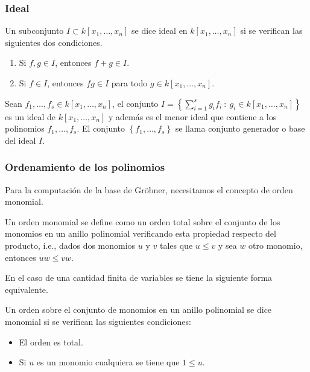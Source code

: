 \subsubsection*{Ideal}

Un subconjunto $I \subset k[x_1, \dotso, x_n]$ se dice ideal en $k[x_1, \dotso, x_n]$ si se verifican las siguientes dos condiciones.
\begin{enumerate}
    \item Si $f, g \in I$, entonces $f + g \in I$.
    \item Si $f \in I$, entonces $fg \in I$ para todo $g \in k[x_1, \dotso, x_n]$.
\end{enumerate}

Sean $f_1, \dotso, f_s \in k[x_1, \dotso, x_n]$, el conjunto $I =  \left\{ \sum_{i=1}^{s} g_i f_i \ : \ g_i \in k[x_1, \dotso, x_n] \right\}$ es un ideal de $k[x_1, \dotso, x_n]$ y además es el menor ideal que contiene a los polinomios $f_1, \dotso, f_s$. El conjunto $\left\{ f_1, \dotso, f_s \right\}$ se llama conjunto generador o base del ideal $I$. 

\subsubsection*{Ordenamiento de los polinomios}

Para la computación de la base de Gröbner, necesitamos el concepto de orden monomial.

\begin{definition}
    Un orden monomial se define como un orden total sobre el conjunto de los monomios en un anillo polinomial verificando esta propiedad respecto del producto, i.e., dados dos monomios $u$ y $v$ tales que $u \leq v$ y sea $w$ otro monomio, entonces $uw \leq vw$.
\end{definition}

En el caso de una cantidad finita de variables se tiene la siguiente forma equivalente.

\begin{definition}
    Un orden sobre el conjunto de monomios en un anillo polinomial se dice monomial si se verifican las siguientes condiciones:
    \begin{itemize}
        \item El orden es total.
        \item Si $u$ es un monomio cualquiera se tiene que $1 \leq u$.
    \end{itemize}
\end{definition}

